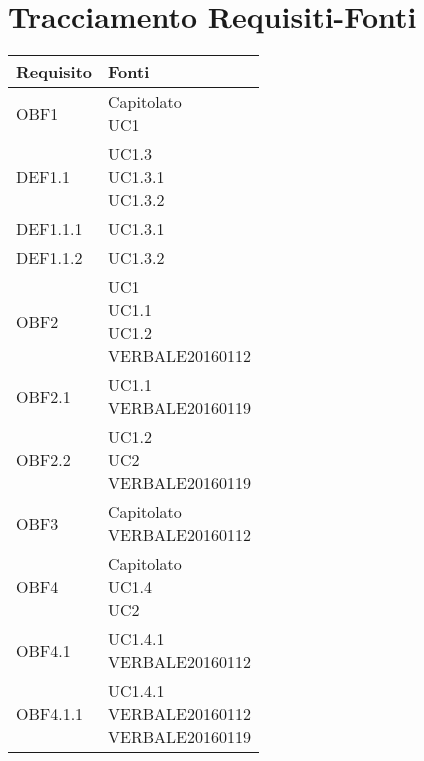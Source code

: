 \documentclass{scalatekids-article}
\begin{document}
\section{Tracciamento Requisiti-Fonti}

\begin{longtable}[H]{|p{5.5cm}|p{5.5cm}|}
  \hline
  \textbf{Requisito} & \textbf{Fonti}\\
  \hline
  OBF1 & \multiLineCell[t]{Capitolato\\UC1\\}\\
  \hline
  DEF1.1 & \multiLineCell[t]{UC1.3\\UC1.3.1\\UC1.3.2\\}\\
  \hline
  DEF1.1.1 & \multiLineCell[t]{UC1.3.1\\}\\
  \hline
  DEF1.1.2 & \multiLineCell[t]{UC1.3.2\\}\\
  \hline
  OBF2 & \multiLineCell[t]{UC1\\UC1.1\\UC1.2\\VERBALE20160112\\}\\
  \hline
  OBF2.1 & \multiLineCell[t]{UC1.1\\VERBALE20160119\\}\\
  \hline
  OBF2.2 & \multiLineCell[t]{UC1.2\\UC2\\VERBALE20160119\\}\\
  \hline
  OBF3 & \multiLineCell[t]{Capitolato\\VERBALE20160112\\}\\
  \hline
  OBF4 & \multiLineCell[t]{Capitolato\\UC1.4\\UC2\\}\\
  \hline
  OBF4.1 & \multiLineCell[t]{UC1.4.1\\VERBALE20160112\\}\\
  \hline
  OBF4.1.1 & \multiLineCell[t]{UC1.4.1\\VERBALE20160112\\VERBALE20160119\\}\\

\end{longtable}
\end{document}
